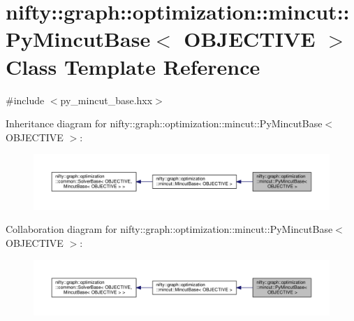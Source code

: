 \hypertarget{classnifty_1_1graph_1_1optimization_1_1mincut_1_1PyMincutBase}{}\section{nifty\+:\+:graph\+:\+:optimization\+:\+:mincut\+:\+:Py\+Mincut\+Base$<$ O\+B\+J\+E\+C\+T\+I\+V\+E $>$ Class Template Reference}
\label{classnifty_1_1graph_1_1optimization_1_1mincut_1_1PyMincutBase}


{\ttfamily \#include $<$py\+\_\+mincut\+\_\+base.\+hxx$>$}



Inheritance diagram for nifty\+:\+:graph\+:\+:optimization\+:\+:mincut\+:\+:Py\+Mincut\+Base$<$ O\+B\+J\+E\+C\+T\+I\+V\+E $>$\+:\nopagebreak
\begin{figure}[H]
\begin{center}
\leavevmode
\includegraphics[width=350pt]{classnifty_1_1graph_1_1optimization_1_1mincut_1_1PyMincutBase__inherit__graph}
\end{center}
\end{figure}


Collaboration diagram for nifty\+:\+:graph\+:\+:optimization\+:\+:mincut\+:\+:Py\+Mincut\+Base$<$ O\+B\+J\+E\+C\+T\+I\+V\+E $>$\+:\nopagebreak
\begin{figure}[H]
\begin{center}
\leavevmode
\includegraphics[width=350pt]{classnifty_1_1graph_1_1optimization_1_1mincut_1_1PyMincutBase__coll__graph}
\end{center}
\end{figure}
